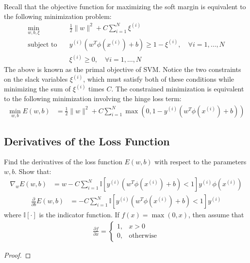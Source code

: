 \documentclass[lang=cn,11pt]{elegantbook}
\begin{document}
Recall that the objective function for maximizing the soft margin is equivalent to the following minimization problem: \begin{align}
    \min_{w, b, \xi} & \quad \frac{1}{2} \|w\|^2 + C \sum_{i=1}^{N} \xi^{(i)} \\
    \text{subject to} & \quad y^{(i)} (w^T \phi(x^{(i)}) + b) \geq 1 - \xi^{(i)}, \quad \forall i = 1, \dots, N \\
    & \quad \xi^{(i)} \geq 0, \quad \forall i = 1, \dots, N
\end{align}
The above is known as the primal objective of SVM. Notice the two constraints on the slack variables $\xi^{(i)}$, which must satisfy both of these conditions while minimizing the sum of $\xi^{(i)}$ times $C$. The constrained minimization is equivalent to the following minimization involving the hinge loss term:
\begin{align}
    \min_{w, b} E(w, b) &= \frac{1}{2} \|w\|^2 + C \sum_{i=1}^{N} \max(0, 1 - y^{(i)}(w^T \phi(x^{(i)}) + b))
\end{align}
\subsection{Derivatives of the Loss Function}
Find the derivatives of the loss function $E(w, b)$ with respect to the parameters $w, b$. Show that: \begin{align}
    \nabla_w E(w, b) &= w - C \sum_{i=1}^{N} \mathbb{I}[y^{(i)} (w^T \phi(x^{(i)}) + b) < 1] y^{(i)} \phi(x^{(i)})
\end{align}\begin{align}
    \frac{\partial}{\partial b} E(w, b) &= -C \sum_{i=1}^{N} \mathbb{I}[y^{(i)} (w^T \phi(x^{(i)}) + b) < 1] y^{(i)}
\end{align}
where $\mathbb{I}[\cdot]$ is the indicator function. If $f(x) = \max(0, x)$, then assume that \begin{align}
    \frac{\partial f}{\partial x} = \begin{cases} 1, & x > 0 \\ 0, & \text{otherwise} \end{cases}
\end{align}
\begin{proof}
\end{proof}
\end{document}
